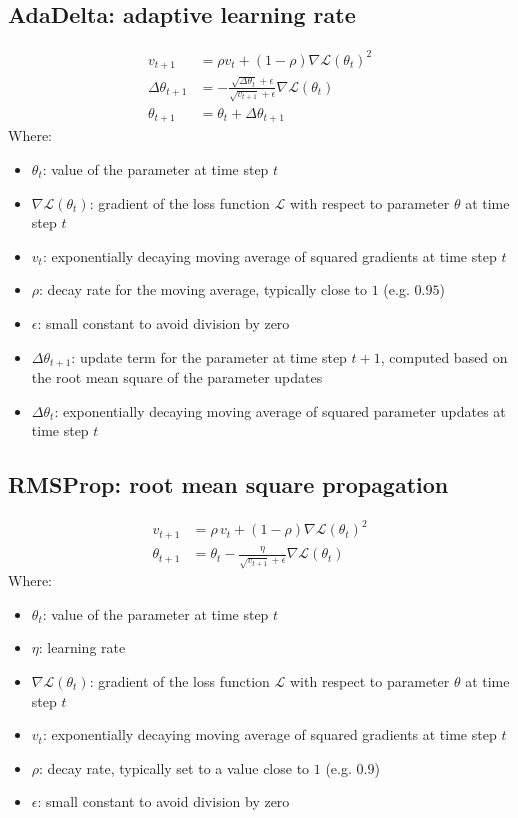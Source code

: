 \documentclass[a4paper]{report}
\newcommand{\ELL}{\mathcal{L}}
\begin{document}
\subsection{AdaDelta: adaptive learning rate}
\begin{align*}
    v_{t+1} &= \rho v_t + (1-\rho)\nabla\ELL(\theta_t)^2 \\
    \Delta\theta_{t+1} &= -\frac{\sqrt{\Delta\theta_t}+\epsilon}{\sqrt{v_{t+1}}+\epsilon} \nabla\ELL(\theta_t) \\
    \theta_{t+1} &= \theta_t + \Delta\theta_{t+1}
\end{align*}
Where:
\begin{itemize}
    \item $\theta_t$: value of the parameter at time step $t$
    \item $\nabla\ELL(\theta_t)$: gradient of the loss function $\ELL$ with respect to parameter $\theta$ at time step $t$
    \item $v_t$: exponentially decaying moving average of squared gradients at time step $t$
    \item $\rho$: decay rate for the moving average, typically close to $1$ (e.g. $0.95$)
    \item $\epsilon$: small constant to avoid division by zero
    \item $\Delta\theta_{t+1}$: update term for the parameter at time step $t+1$, computed based on the root mean square of the parameter updates
    \item $\Delta\theta_{t}$: exponentially decaying moving average of squared parameter updates at time step $t$
\end{itemize}

\subsection{RMSProp: root mean square propagation}
\begin{align*}
    v_{t+1} &= \rho \, v_{t} + (1-\rho) {\nabla\ELL(\theta_t)}^2 \\
    \theta_{t+1} &= \theta_{t} - \frac{\eta}{\sqrt{v_{t+1}} + \epsilon} \nabla\ELL(\theta_t)
\end{align*}
Where:
\begin{itemize}
    \item $\theta_t$: value of the parameter at time step $t$
    \item $\eta$: learning rate
    \item $\nabla\ELL(\theta_t)$: gradient of the loss function $\ELL$ with respect to parameter $\theta$ at time step $t$
    \item $v_t$: exponentially decaying moving average of squared gradients at time step $t$
    \item $\rho$: decay rate, typically set to a value close to $1$ (e.g. $0.9$)
    \item $\epsilon$: small constant to avoid division by zero
\end{itemize}
\end{document}
